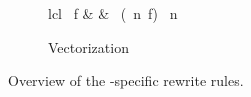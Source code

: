 \begin{figure}[t]
\vspace{\ruleSpace}
\begin{subfigure}[b]{1\linewidth}
  \begin{mdframed}
    \vspace{-\bigskipamount}
    \begin{rerule*}{lcl}
      \map\ f
        & \rightarrow &
          \asScalar
            \circ \map\ (\vect\ n\ f)
            \circ \asVector\ n
    \end{rerule*}
  \end{mdframed}
  \vspace{-1em}
  \caption{Vectorization}
  \label{fig:low:vect}
\end{subfigure}

\caption{Overview of the \OpenCL-specific rewrite rules.}
\label{fig:lowRules}
\end{figure}

\FloatBarrier



%
%

